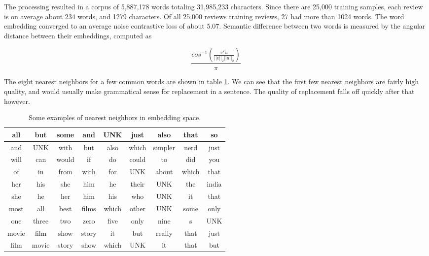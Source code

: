 The processing resulted in a corpus of 5,887,178 words totaling 31,985,233 characters.  Since there are 25,000 training samples, each review is on average about 234 words, and 1279 characters.  Of all 25,000 reviews training reviews, 27 had more than 1024 words.  The word embedding converged to an average noise contrastive loss of about 5.07.   Semantic difference between two words is measured by the angular distance between their embeddings, computed as

$$ \frac{cos^{-1}\left(\frac{v^Tu}{||v||_2||u||_2}\right)}{\pi}$$

\noindent
The eight nearest neighbors for a few common words are shown in table \ref{tab:nearest_words}.  We can see that the first few nearest neighbors are fairly high quality, and would usually make grammatical sense for replacement in a sentence.  The quality of replacement falls off quickly after that however.

\begin{table}[h]
\centering
\begin{tabular}{ | c |  c  c  c  c  c  c  c  c | }
    \hline
    all & but& some& and& UNK& just& also& that& so \\ \hline
    and & UNK& with& but& also& which& simpler& nerd& just \\ \hline
    will & can& would& if& do& could& to& did& you \\ \hline
    of & in& from& with& for& UNK& about& which& that \\ \hline
    her & his& she& him& he& their& UNK& the& india \\ \hline
    she & he& her& him& his& who& UNK& it& that \\ \hline
    most & all& best& films& which& other& UNK& some& only \\ \hline
    one & three& two& zero& five& only& nine& s& UNK \\ \hline
    movie & film& show& story& it& but& really& that& just \\ \hline 
    film & movie& story& show& which& UNK& it& that& but \\ \hline
\end{tabular}
\caption{Some examples of nearest neighbors in embedding space.}
\label{tab:nearest_words}
\end{table}
